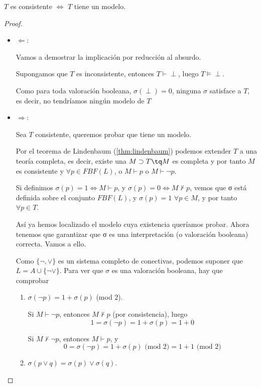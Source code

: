 \documentclass{apuntes}
\begin{document}
\begin{theorem}
	$T$ es consistente $\iff$ $T$ tiene un modelo.
	\label{thm:comp2}
\end{theorem}

\begin{proof}
	\begin{itemize}
		\item $\Longleftarrow$: 

		Vamos a demostrar la implicación por reducción al absurdo.

		Supongamos que $T$ es inconsistente, entonces $T\vdash \perp$, luego $T\vDash\perp$.

		Como para toda valoración booleana, $\sigma(\perp) = 0$, ninguna $\sigma$ satisface a $T$, es decir, no tendríamos ningún modelo de $T$
		\item $\Longrightarrow$: 

		Sea $T$ consistente, queremos probar que tiene un modelo. 

		Por el teorema de Lindenbaum (\ref{thm:lindenbaum}) podemos extender $T$ a una teoría completa, es decir, existe una $M\supset T \tq M$ es completa y por tanto $M$ es consistente y $\forall p \in FBF(L)$, o $M\vdash p$ o $M\vdash \neg p$.

		Si definimos $\sigma(p) = 1 \iff M\vdash p$, y $\sigma(p) = 0 \iff M\nvdash p$, vemos que σ está definida sobre el conjunto $FBF(L)$, y $\sigma(p) = 1$ $\forall p \in M$, y por tanto $\forall p\in T$.

		Así ya hemos localizado el modelo cuya existencia queríamos probar. Ahora tenemos que garantizar que σ es una interpretación (o valoración booleana) correcta. Vamos a ello.

		Como $\{\neg, \vee\}$ es un sistema completo de conectivas, podemos suponer que $L=A\cup\{\neg\vee\}$. Para ver que $\sigma$ es una valoración booleana, hay que comprobar
		\begin{enumerate}
			\item $\sigma(\neg p) = 1+\sigma(p)$ (mod $2$).

			Si $M \vdash \neg p$, entonces $M\nvdash p$ (por consistencia), luego
			$$1 = \sigma(\neg p) = 1+\sigma(p) = 1 + 0$$

			Si $M \nvdash \neg p$, entonces $M\vdash p$, y
			$$0=\sigma(\neg p) = 1+\sigma(p) \text{ (mod 2)} = 1+1 \text{ (mod 2)}$$

			\item $\sigma(p\vee q) = \sigma(p)\vee\sigma(q)$.
			

\end{enumerate}
\end{itemize}
\end{proof}
\end{document}
